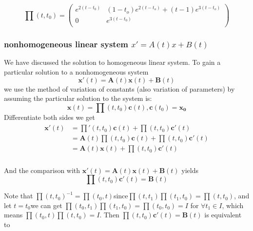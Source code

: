 \documentclass[a4paper]{article}
\begin{document}
\begin{equation}
\prod (t,{{t}_{0}})=\left( \begin{matrix}
   {{e}^{2(t-{{t}_{0}})}} & (1-{{t}_{o}}){{e}^{2(t-{{t}_{o}})}}+(t-1){{e}^{3(t-{{t}_{o}})}}  \\
   0 & {{e}^{3(t-{{t}_{0}})}}  \\
\end{matrix} \right)
\end{equation}

\subsubsection{nonhomogeneous linear system $x'=A(t)x+B(t)$}
We have discussed the solution to homogeneous linear system. To gain a particular solution to a nonhomogeneous system \[\mathbf{x'}(t)=\mathbf{A}(t)\mathbf{x}(t)+\mathbf{B}(t)\]we use the method of variation of constants (also variation of parameters) by assuming the particular solution to the system is:
\begin{equation}
\mathbf{x}(t)=\prod (t,{{t}_{0}})\mathbf{c}(t),\mathbf{c}({{t}_{0}})={{\mathbf{x}}_{\mathbf{0}}}
\end{equation}
Differentiate both sides we get
\begin{eqnarray}     %
\left.                       %
\begin{array}{lll}       %
\mathbf{x}'(t)&=\prod '(t,{{t}_{0}})\mathbf{c}(t)+\prod (t,{{t}_{0}})\mathbf{c}'(t) \\
&=\mathbf{A}(t)\prod (t,{{t}_{0}})\mathbf{c}(t)+\prod (t,{{t}_{0}})\mathbf{c}'(t) \\
&=\mathbf{A}(t)\mathbf{x}(t)+\prod (t,{{t}_{0}})\mathbf{c}'(t) \\
\end{array}              %
\right.                       %
\end{eqnarray}

And the comparison with $\mathbf{x'}(t)=\mathbf{A}(t)\mathbf{x}(t)+\mathbf{B}(t)$ yields
\begin{equation}
\prod (t,{{t}_{0}})\mathbf{c}'(t)=\mathbf{B}(t)
\end{equation}

Note that $\prod {{(t,{{t}_{0}})}^{-1}}=\prod ({{t}_{0}},t)$since$\prod (t,{{t}_{1}})\prod ({{t}_{1}},{{t}_{0}})=\prod (t,{{t}_{0}})$, and let $t={{t}_{0}}$we can get $\prod ({{t}_{0}},{{t}_{1}})\prod ({{t}_{1}},{{t}_{0}})=\prod ({{t}_{0}},{{t}_{0}})=I$ for $\forall {{t}_{1}}\in I$, which means $\prod ({{t}_{0}},t)\prod (t,{{t}_{0}})=I$. Then $\prod (t,{{t}_{0}})\mathbf{c}'(t)=\mathbf{B}(t)$ is equivalent to
\end{document}
